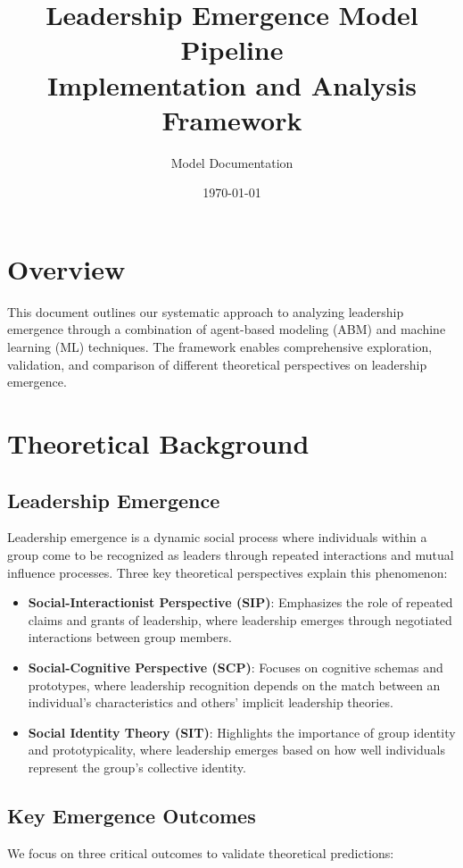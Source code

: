 \documentclass[12pt]{article}
\title{Leadership Emergence Model Pipeline\\
\large Implementation and Analysis Framework}
\author{Model Documentation}
\date{\today}
\begin{document}
\maketitle
\tableofcontents
\newpage

\section{Overview}
This document outlines our systematic approach to analyzing leadership emergence through a combination of agent-based modeling (ABM) and machine learning (ML) techniques. The framework enables comprehensive exploration, validation, and comparison of different theoretical perspectives on leadership emergence.

\section{Theoretical Background}

\subsection{Leadership Emergence}
Leadership emergence is a dynamic social process where individuals within a group come to be recognized as leaders through repeated interactions and mutual influence processes. Three key theoretical perspectives explain this phenomenon:

\begin{itemize}
    \item \textbf{Social-Interactionist Perspective (SIP)}: Emphasizes the role of repeated claims and grants of leadership, where leadership emerges through negotiated interactions between group members.
    
    \item \textbf{Social-Cognitive Perspective (SCP)}: Focuses on cognitive schemas and prototypes, where leadership recognition depends on the match between an individual's characteristics and others' implicit leadership theories.
    
    \item \textbf{Social Identity Theory (SIT)}: Highlights the importance of group identity and prototypicality, where leadership emerges based on how well individuals represent the group's collective identity.
\end{itemize}

\subsection{Key Emergence Outcomes}
We focus on three critical outcomes to validate theoretical predictions:
\end{document}
